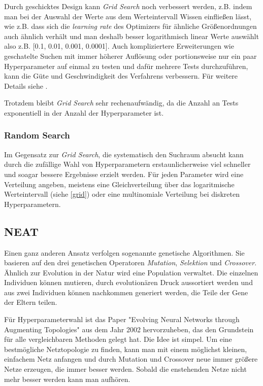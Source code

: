 \documentclass[]{scrartcl}
\begin{document}
			Durch geschicktes Design kann \textit{Grid Search} noch verbessert werden, z.B. indem man bei der Auswahl der Werte aus dem Werteintervall
			Wissen einfließen lässt, wie z.B. dass sich die \textit{learning rate} des Optimizers für ähnliche Größenordnungen auch ähnlich verhält und 
			man deshalb besser logarithmisch linear Werte auswählt also z.B. [0.1, 0.01, 0.001, 0.0001].
			Auch kompliziertere Erweiterungen wie geschatelte Suchen mit immer höherer Auflösung oder portionsweise
			nur ein paar Hyperparameter auf einmal zu testen und dafür mehrere Tests durchzuführen, kann die Güte und Geschwindigkeit des Verfahrens verbessern.
			Für weitere Details siehe \cite{parameters}.

			Trotzdem bleibt \textit{Grid Search} sehr rechenaufwändig, da die Anzahl an Tests exponentiell in der Anzahl der Hyperparameter ist.


		\subsubsection{Random Search}

			Im Gegensatz zur \textit{Grid Search}, die systematisch den Suchraum absucht kann durch die zufällige Wahl von Hyperparametern erstaunlicherweise
			viel schneller und soagar bessere Ergebnisse erzielt werden. \cite{randomsearch}
			Für jeden Parameter wird eine Verteilung angeben, meistens eine Gleichverteilung über das logaritmische Werteintervall (siehe \ref{grid})
			oder eine multinomiale Verteilung bei diskreten Hyperparametern.

		\subsection{NEAT}

			Einen ganz anderen Ansatz verfolgen sogenannte genetische Algorithmen. Sie basieren auf den drei genetischen Operatoren \textit{Mutation}, \textit{Selektion} und \textit{Crossover}.
			Ähnlich zur Evolution in der Natur wird eine Population verwaltet. Die einzelnen Individuen können mutieren, durch evolutionären Druck aussortiert werden und aus zwei
			Individuen können nachkommen generiert werden, die Teile der Gene der Eltern teilen.
			
			Für Hyperparameterwahl ist das Paper "Evolving Neural Networks through Augmenting Topologies" \cite{neat} aus dem Jahr 2002 hervorzuheben, das den Grundstein für alle vergleichbaren Methoden gelegt hat.
			Die Idee ist simpel. Um eine bestmögliche Netztopologie zu finden, kann man mit einem möglichst kleinen, einfachem Netz anfangen und durch Mutation und Crossover
			neue immer größere Netze erzeugen, die immer besser werden. Sobald die enstehenden Netze nicht mehr besser werden kann man aufhören.
\end{document}
